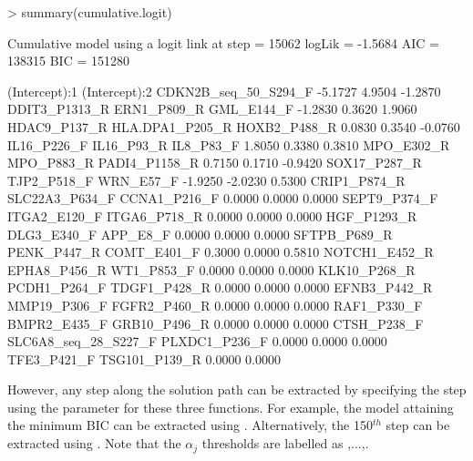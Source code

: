 \documentclass[article, shortclass, nojss]{jss}
\begin{document}
\begin{Schunk}
\begin{Sinput}
> summary(cumulative.logit)
\end{Sinput}
\begin{Soutput}
Cumulative model using a  logit  link 
at step    =  15062 
logLik     =  -1.5684 
AIC        =  138315 
BIC        =  151280 

       (Intercept):1        (Intercept):2 CDKN2B_seq_50_S294_F 
             -5.1727               4.9504              -1.2870 
       DDIT3_P1313_R          ERN1_P809_R           GML_E144_F 
             -1.2830               0.3620               1.9060 
        HDAC9_P137_R      HLA.DPA1_P205_R         HOXB2_P488_R 
              0.0830               0.3540              -0.0760 
         IL16_P226_F           IL16_P93_R            IL8_P83_F 
              1.8050               0.3380               0.3810 
          MPO_E302_R           MPO_P883_R        PADI4_P1158_R 
              0.7150               0.1710              -0.9420 
        SOX17_P287_R          TJP2_P518_F            WRN_E57_F 
             -1.9250              -2.0230               0.5300 
        CRIP1_P874_R       SLC22A3_P634_F         CCNA1_P216_F 
              0.0000               0.0000               0.0000 
        SEPT9_P374_F         ITGA2_E120_F         ITGA6_P718_R 
              0.0000               0.0000               0.0000 
         HGF_P1293_R          DLG3_E340_F             APP_E8_F 
              0.0000               0.0000               0.0000 
        SFTPB_P689_R          PENK_P447_R          COMT_E401_F 
              0.3000               0.0000               0.5810 
       NOTCH1_E452_R         EPHA8_P456_R           WT1_P853_F 
              0.0000               0.0000               0.0000 
        KLK10_P268_R         PCDH1_P264_F         TDGF1_P428_R 
              0.0000               0.0000               0.0000 
        EFNB3_P442_R         MMP19_P306_F         FGFR2_P460_R 
              0.0000               0.0000               0.0000 
         RAF1_P330_F         BMPR2_E435_F         GRB10_P496_R 
              0.0000               0.0000               0.0000 
         CTSH_P238_F SLC6A8_seq_28_S227_F        PLXDC1_P236_F 
              0.0000               0.0000               0.0000 
         TFE3_P421_F        TSG101_P139_R 
              0.0000               0.0000 
\end{Soutput}
\end{Schunk}
However, any step along the solution path can be extracted by specifying the step using the  parameter for these three functions. For example, the model attaining the minimum BIC can be extracted using 
\newline {}. \newline Alternatively, the 150$^{th}$ step can be extracted using \newline {}. \newline Note that the $\alpha_j$ thresholds are labelled as ,$\ldots$,.
\end{document}
